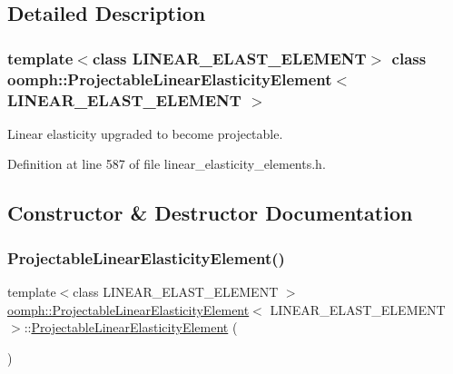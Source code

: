 \subsection{Detailed Description}
\subsubsection*{template$<$class L\+I\+N\+E\+A\+R\+\_\+\+E\+L\+A\+S\+T\+\_\+\+E\+L\+E\+M\+E\+NT$>$\newline
class oomph\+::\+Projectable\+Linear\+Elasticity\+Element$<$ L\+I\+N\+E\+A\+R\+\_\+\+E\+L\+A\+S\+T\+\_\+\+E\+L\+E\+M\+E\+N\+T $>$}

Linear elasticity upgraded to become projectable. 

Definition at line 587 of file linear\+\_\+elasticity\+\_\+elements.\+h.



\subsection{Constructor \& Destructor Documentation}
\mbox{\label{classoomph_1_1ProjectableLinearElasticityElement_ad1e0ae5180930c9c1b52855b89a5e1a2}} 
\subsubsection{\texorpdfstring{Projectable\+Linear\+Elasticity\+Element()}{ProjectableLinearElasticityElement()}}
{\footnotesize\ttfamily template$<$class L\+I\+N\+E\+A\+R\+\_\+\+E\+L\+A\+S\+T\+\_\+\+E\+L\+E\+M\+E\+NT $>$ \\
\hyperlink{classoomph_1_1ProjectableLinearElasticityElement}{oomph\+::\+Projectable\+Linear\+Elasticity\+Element}$<$ L\+I\+N\+E\+A\+R\+\_\+\+E\+L\+A\+S\+T\+\_\+\+E\+L\+E\+M\+E\+NT $>$\+::\hyperlink{classoomph_1_1ProjectableLinearElasticityElement}{Projectable\+Linear\+Elasticity\+Element} (\begin{DoxyParamCaption}{ }\end{DoxyParamCaption})\hspace{0.3cm}{\ttfamily [inline]}}



